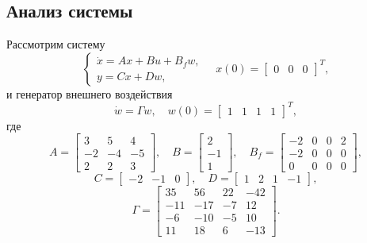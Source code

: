 \subsection{Анализ системы}
Рассмотрим систему
\begin{equation}
    \begin{cases}
        \dot x=Ax+Bu+B_fw,\\
        y=Cx+Dw,
    \end{cases}\quad
    x(0)=\begin{bmatrix}
        0&0&0
    \end{bmatrix}^T,
    \label{eq:sys3}
\end{equation}
и генератор внешнего воздействия
\begin{equation*}
    \dot w=\Gamma w,\quad w(0)=\begin{bmatrix}
        1&1&1&1
    \end{bmatrix}^T,
\end{equation*}
где
\begin{equation*}
    A=\begin{bmatrix}
        3&5&4\\
        -2&-4&-5\\
        2&2&3
    \end{bmatrix},\quad
    B=\begin{bmatrix}
        2\\-1\\1
    \end{bmatrix},\quad
    B_f=\begin{bmatrix}
        -2&0&0&2\\
        -2&0&0&0\\
        0&0&0&0
    \end{bmatrix},
\end{equation*}
\begin{equation*}
    C=\begin{bmatrix}
        -2&-1&0
    \end{bmatrix},\quad
    D=\begin{bmatrix}
        1&2&1&-1
    \end{bmatrix},
\end{equation*}
\begin{equation*}
    \Gamma=\begin{bmatrix}
        35&56&22&-42\\
        -11&-17&-7&12\\
        -6&-10&-5&10\\
        11&18&6&-13
    \end{bmatrix}.
\end{equation*}
